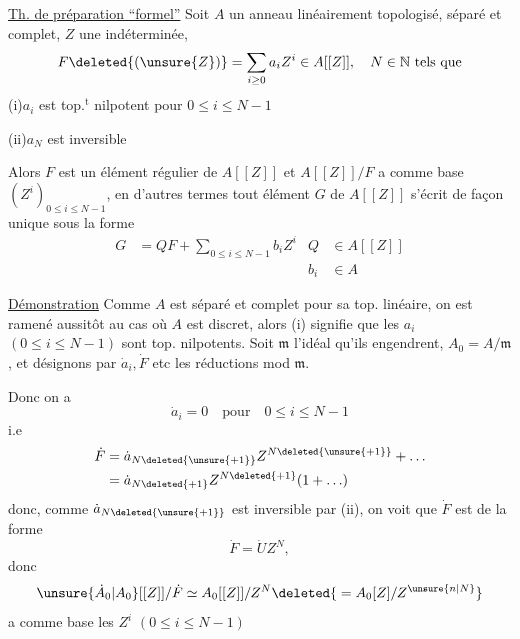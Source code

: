 \uline{Th. de préparation ``formel''} Soit $A$ un anneau linéairement topologisé, séparé et complet, $Z$ une indéterminée,
\[
F\deleted{(\unsure{Z})}=\sum_{i\geq 0}a_i Z^i\in A[[Z]],\quad N\in\mathbb N\ \text{tels que}
\]
(i)\qquad $a_i$ est top.$^{\mathrm t}$ nilpotent pour $0\leq i\leq N-1$

(ii)\qquad $a_N$ est inversible

Alors $F$ est un élément régulier de $A[[Z]]$ et $A[[Z]]/F$ a comme base $(Z^i)_{0\leq i\leq N-1}$, en d'autres termes tout élément $G$ de $A[[Z]]$ s'écrit de façon unique sous la forme
\[
\begin{aligned}
G&=QF+\sum_{0\leq i\leq N-1}b_iZ^i & Q&\in A[[Z]]\\
&&b_i&\in A
\end{aligned}
\]

\uline{Démonstration} Comme $A$ est séparé et complet pour sa top. linéaire, on est ramené aussitôt au cas où $A$ est discret, alors (i) signifie que les $a_i$ $(0\leq i\leq N-1)$ sont top. nilpotents. Soit $\mathfrak m$ l'idéal  qu'ils engendrent, $A_0=A/\mathfrak m$, et désignons par $\dot a_i,\dot F$ etc les réductions mod $\mathfrak m$.

 Donc on a 
\[
\dot a_i=0\quad\text{pour}\quad 0\leq i\leq N-1
\]
i.e
\[
\begin{aligned}
\dot F&=\dot a_{N\deleted{\unsure{+1}}}Z^{N\deleted{\unsure{+1}}}+\ldots\\
&=\dot a_{N\deleted{+1}}Z^{N\deleted{+1}}(1+\ldots)
\end{aligned}
\]
donc, comme $\dot a_{N\deleted{\unsure{+1}}}$ est inversible par (ii), on voit que $\dot F$ est de la forme
\[
\dot F=\dot U Z^N,
\]
 donc
\[
\unsure{\dot A_0|A_0}[[Z]]/\dot F\simeq A_0[[Z]]/Z^N\deleted{{}=A_0[Z]/Z^{\unsure{n|N}}}
\]
a comme base les $Z^i$ $(0\leq i\leq N-1)$




